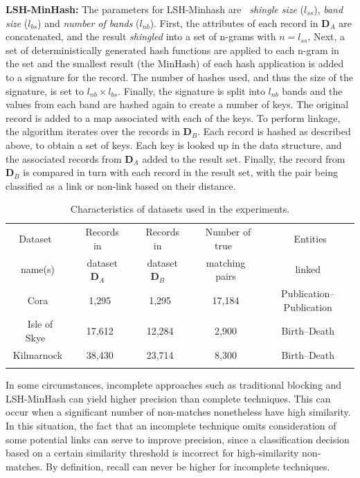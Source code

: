 \documentclass{llncs}
\begin{document}
\textbf{LSH-MinHash:} The parameters for LSH-Minhash
are~\cite{Broder1997} \emph{shingle size} ($l_{ss}$), \emph{band size}
($l_{bs}$) and \emph{number of bands} ($l_{nb}$). First, the attributes
of each record in $\mathbf{D}_A$ are concatenated, and the result
\emph{shingled} into a set of n-grams with $n = l_{ss}$. Next, a set of
deterministically generated hash functions are applied to each n-gram in
the set and the smallest result (the MinHash) of each hash application
is added to a signature for the record. The number of hashes used, and
thus the size of the signature, is set to $l_{nb} \times l_{bs}$.
Finally, the signature is split into $l_{nb}$ bands and the values from
each band are hashed again to create a number of keys. The original
record is added to a map associated with each of the keys. To perform
linkage, the algorithm iterates over the records in $\mathbf{D}_B$. Each
record is hashed as described above, to obtain a set of keys. Each key
is looked up in the data structure, and the associated records from
$\mathbf{D}_A$ added to the result set. Finally, the record from
$\mathbf{D}_B$ is compared in turn with each record in the result set,
with the pair being classified as a link or non-link based on their
distance.

\begin{table}[t]
\caption{Characteristics of datasets used in the experiments.}
 \label{table-datasets}
  \centering
  \begin{scriptsize}
  \begin{tabular}{ccccc}
  \hline\noalign{\smallskip}
  Dataset~ & ~Records in~& ~Records in~ & ~Number of true~& ~Entities \\
    name(s)  & ~dataset $\mathbf{D}_A$~ & ~dataset $\mathbf{D}_B$~ &
    matching pairs & linked \\
  \noalign{\smallskip} \hline \noalign{\smallskip}
  Cora & 1,295 & 1,295 & 17,184 & Publication--Publication\\
  ~Isle of Skye~ & 17,612 & 12,284& 2,900 & Birth--Death \\
  Kilmarnock & ~38,430~ & ~23,714~ & ~8,300~ & ~Birth--Death~ \\
  \noalign{\smallskip} \hline
  \end{tabular}
  \end{scriptsize}
\end{table}

In some circumstances, incomplete approaches such as traditional
blocking and LSH-MinHash can yield higher precision than complete
techniques. This can occur when a significant number of non-matches
nonetheless have high similarity. In this situation, the fact that an
incomplete technique omits consideration of some potential links can
serve to improve precision, since a classification decision based on a
certain similarity threshold is incorrect for high-similarity
non-matches. By definition, recall can never be higher for incomplete
techniques.
\end{document}
